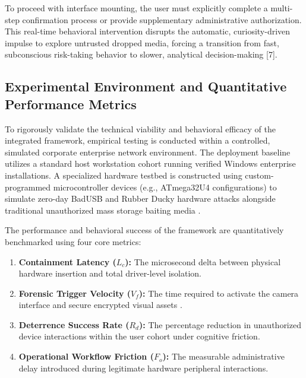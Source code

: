 \documentclass{ieeeaccess}
\begin{document}
To proceed with interface mounting, the user must explicitly complete a multi-step confirmation process or provide supplementary administrative authorization. This real-time behavioral intervention disrupts the automatic, curiosity-driven impulse to explore untrusted dropped media, forcing a transition from fast, subconscious risk-taking behavior to slower, analytical decision-making [7].

\subsection{Experimental Environment and Quantitative Performance Metrics}
To rigorously validate the technical viability and behavioral efficacy of the integrated framework, empirical testing is conducted within a controlled, simulated corporate enterprise network environment. The deployment baseline utilizes a standard host workstation cohort running verified Windows enterprise installations. A specialized hardware testbed is constructed using custom-programmed microcontroller devices (e.g., ATmega32U4 configurations) to simulate zero-day BadUSB and Rubber Ducky hardware attacks alongside traditional unauthorized mass storage baiting media \cite{ref17}.

The performance and behavioral success of the framework are quantitatively benchmarked using four core metrics:
\begin{enumerate}
    \item \textbf{Containment Latency ($L_c$):} The microsecond delta between physical hardware insertion and total driver-level isolation.
    \item \textbf{Forensic Trigger Velocity ($V_f$):} The time required to activate the camera interface and secure encrypted visual assets .
    \item \textbf{Deterrence Success Rate ($R_d$):} The percentage reduction in unauthorized device interactions within the user cohort under cognitive friction.
    \item \textbf{Operational Workflow Friction ($F_o$):} The measurable administrative delay introduced during legitimate hardware peripheral interactions.
\end{enumerate}

\begin{table}[htbp]
\centering
\caption{Experimental Simulation Environment and Parameter Configurations}
\label{tab:simulation_config}
\end{table}
\end{document}
